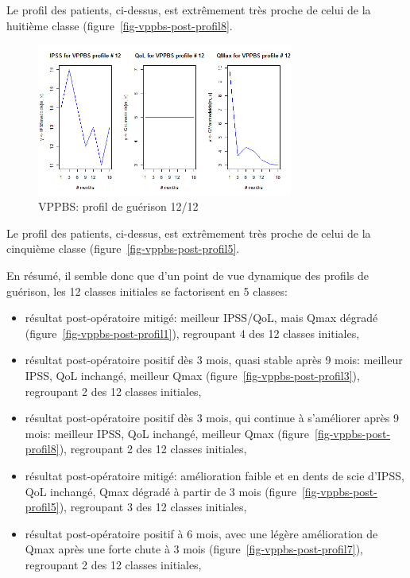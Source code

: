Le profil des patients, ci-dessus, est extrêmement très proche de celui de la huitième classe (figure~\ref{fig-vppbs-post-profil8}.


\begin{figure}[H]
\centering
\includegraphics[width=0.75\textwidth]{../Fig/VPPBS/vppbs-profil-post-12.png}
\caption[]{VPPBS: profil de guérison 12/12}
\label{fig-vppbs-post-profil12}
\end{figure}

Le profil des patients, ci-dessus, est extrêmement très proche de celui de la cinquième classe (figure~\ref{fig-vppbs-post-profil5}.

En résumé, il semble donc que d'un point de vue dynamique des profils de guérison, les 12 classes initiales se factorisent en 5 classes:
\begin{itemize}
\item résultat post-opératoire mitigé: meilleur IPSS/QoL, mais Qmax dégradé (figure~\ref{fig-vppbs-post-profil1}), regroupant 4 des 12 classes initiales,
\item résultat post-opératoire positif dès 3 mois, quasi stable après 9 mois: meilleur IPSS, QoL inchangé, meilleur Qmax (figure~\ref{fig-vppbs-post-profil3}), regroupant 2 des 12 classes initiales,
\item résultat post-opératoire positif dès 3 mois, qui continue à s'améliorer après 9 mois: meilleur IPSS, QoL inchangé, meilleur Qmax (figure~\ref{fig-vppbs-post-profil8}), regroupant 2 des 12 classes initiales,
\item résultat post-opératoire mitigé: amélioration faible et en dents de scie d'IPSS, QoL inchangé, Qmax dégradé à partir de 3 mois (figure~\ref{fig-vppbs-post-profil5}), regroupant 3 des 12 classes initiales,
\item résultat post-opératoire positif à 6 mois, avec une légère amélioration de Qmax après une forte chute à 3 mois (figure~\ref{fig-vppbs-post-profil7}), regroupant 2 des 12 classes initiales,
\end{itemize}

